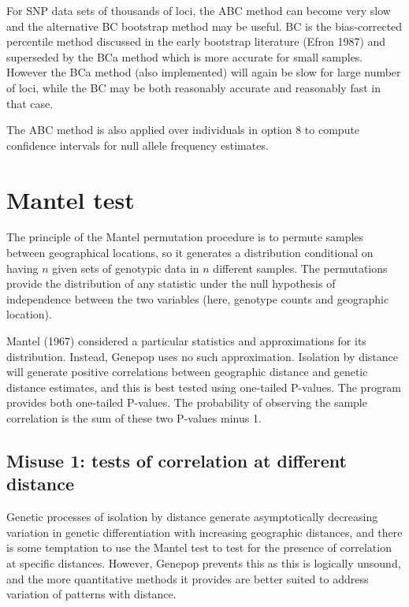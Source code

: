 \documentclass[
  12pt,
]{book}
\begin{document}
For SNP data sets of thousands of loci, the ABC method can become very slow and the alternative BC bootstrap method may be useful. BC is the bias-corrected percentile method discussed in the early bootstrap literature (Efron 1987) and superseded by the BCa method which is more accurate for small samples. However the BCa method (also implemented) will again be slow for large number of loci, while the BC may be both reasonably accurate and reasonably fast in that case.

The ABC method is also applied over individuals in option 8 to compute confidence intervals for null allele frequency estimates.

\hypertarget{mantel-test}{%
\section{Mantel test}\label{mantel-test}}

The principle of the Mantel permutation procedure is to permute samples between geographical locations, so it generates a distribution conditional on having \(n\) given sets of genotypic data in \(n\) different samples. The permutations provide the distribution of any statistic under the null hypothesis of independence between the two variables (here, genotype counts and geographic location).

Mantel (1967) considered a particular statistics and approximations for its distribution. Instead, Genepop uses no such approximation. Isolation by distance will generate positive correlations between geographic distance and genetic distance estimates, and this is best tested using one-tailed P-values. The program provides both one-tailed P-values. The probability of observing the sample correlation is the sum of these two P-values minus 1.

\hypertarget{misuse-1-tests-of-correlation-at-different-distance}{%
\subsection{Misuse 1: tests of correlation at different distance}\label{misuse-1-tests-of-correlation-at-different-distance}}

Genetic processes of isolation by distance generate asymptotically decreasing variation in genetic differentiation with increasing geographic distances, and there is some temptation to use the Mantel test to test for the presence of correlation at specific distances. However, Genepop prevents this as this is logically unsound, and the more quantitative methods it provides are better suited to address variation of patterns with distance.
\end{document}
